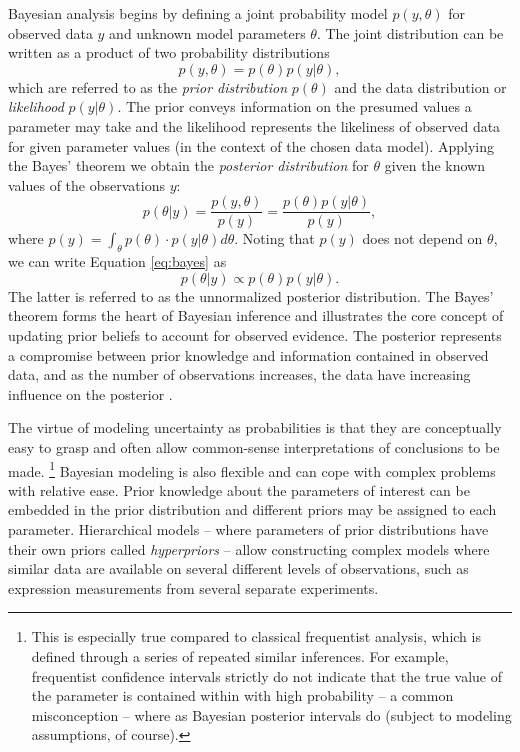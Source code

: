 Bayesian analysis begins by defining a joint probability model $p(y,\theta)$
for observed data $y$ and unknown model parameters $\theta$.
The joint distribution can be written as a product of two probability distributions
\begin{equation}
  p(y,\theta) = p(\theta) p(y|\theta),
\end{equation}
which are referred to as the \emph{prior distribution} $p(\theta)$ and the
data distribution or \emph{likelihood} $p(y|\theta)$. The prior conveys
information on the presumed values a parameter may take and the likelihood
represents the likeliness of observed data for given parameter values (in the
context of the chosen data model). Applying the Bayes' theorem we obtain the
\emph{posterior distribution} for $\theta$ given the known values of the
observations $y$:
\begin{equation}
  \label{eq:bayes}
  p(\theta|y) = \frac{p(y,\theta)}{p(y)} = \frac{p(\theta) p(y|\theta)}{p(y)},
\end{equation}
where $p(y) = \int_{\theta} p(\theta) \cdot p(y|\theta) d\theta$.
Noting that $p(y)$ does not depend on $\theta$, we can write Equation
\ref{eq:bayes} as
\begin{equation}
  p(\theta|y) \propto p(\theta) p(y|\theta).
\end{equation}
The latter is referred to as the unnormalized posterior distribution. The
Bayes' theorem forms the heart of Bayesian inference and illustrates the core
concept of updating prior beliefs to account for observed evidence. The
posterior represents a compromise between prior knowledge and information
contained in observed data, and as the number of observations increases, the
data have increasing influence on the posterior \citep{Gelman2013}.

The virtue of modeling uncertainty as probabilities is that they are
conceptually easy to grasp and often allow common-sense interpretations of conclusions
to be made.
\footnote{This is especially true compared to classical frequentist analysis,
which is defined through a series of repeated similar inferences. For
example, frequentist confidence intervals strictly do not indicate that the
true value of the parameter is contained within with high probability -- a
common misconception -- where as Bayesian posterior intervals do (subject to
modeling assumptions, of course).}
Bayesian modeling is also flexible and can cope with complex problems with
relative ease. Prior knowledge about the parameters of interest can be
embedded in the prior distribution and different priors may be assigned to
each parameter. Hierarchical models -- where parameters of prior
distributions have their own priors called \emph{hyperpriors} -- allow
constructing complex models where similar data are available on several
different levels of observations, such as expression measurements from
several separate experiments.

